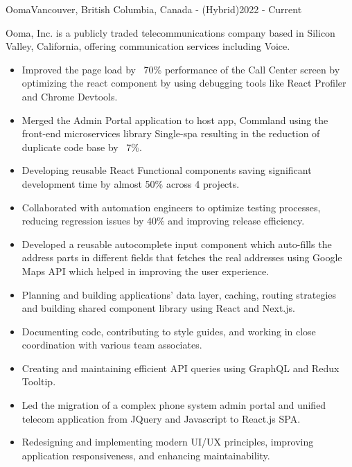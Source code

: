 %
%
%

\begin{projects}
    \project
    {Ooma}{Vancouver, British Columbia, Canada - (Hybrid)}{2022 - Current}
    {}
    {Ooma, Inc. is a publicly traded telecommunications company based in Silicon Valley, California, offering communication services including Voice.
    \begin{itemize}
        \item Improved the page load by ~70\% performance of the Call Center screen by optimizing the react component by using debugging tools like React Profiler and Chrome Devtools.
        \item Merged the Admin Portal application to host app, Commland using the front-end microservices library Single-spa resulting in the reduction of duplicate code base by ~7\%.
        \item Developing reusable React Functional components saving significant development time by almost 50\% across 4 projects.
        \item Collaborated with automation engineers to optimize testing processes, reducing regression issues by 40\% and improving release efficiency.
        \item Developed a reusable autocomplete input component which auto-fills the address parts in different fields that fetches the real addresses using Google Maps API which helped in improving the user experience.
        \item Planning and building applications' data layer, caching, routing strategies and building shared component library using React and Next.js.
        \item Documenting code, contributing to style guides, and working in close coordination with various team associates.
        \item Creating and maintaining efficient API queries using GraphQL and Redux Tooltip. 
        \item Led the migration of a complex phone system admin portal and unified telecom application from JQuery and Javascript to React.js SPA.
        \item Redesigning and implementing modern UI/UX principles, improving application responsiveness, and enhancing maintainability.

\end{itemize}}
\end{projects}
